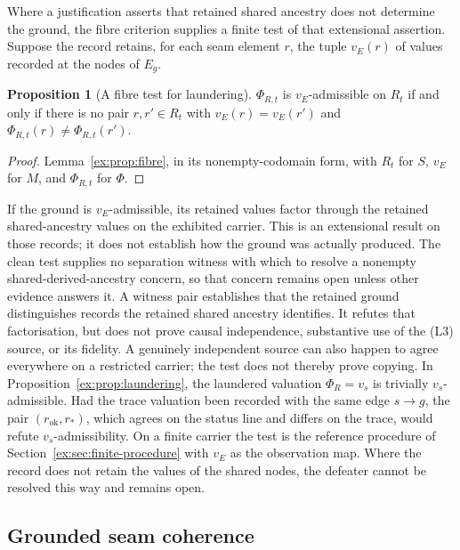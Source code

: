 \documentclass[11pt]{article}
\theoremstyle{definition}
\newtheorem{proposition}{Proposition}[section]
\begin{document}
Where a justification asserts that retained shared ancestry does not determine the ground, the fibre criterion supplies a finite test of that extensional assertion. Suppose the record retains, for each seam element $r$, the tuple $v_E(r)$ of values recorded at the nodes of $E_g$.

\begin{proposition}[A fibre test for laundering]\label{ex:prop:laundering-test}
$\Phi_{R,t}$ is $v_E$-admissible on $R_t$ if and only if there is no pair $r,r'\in R_t$ with $v_E(r)=v_E(r')$ and $\Phi_{R,t}(r)\neq\Phi_{R,t}(r')$.
\end{proposition}
\begin{proof}
Lemma~\ref{ex:prop:fibre}, in its nonempty-codomain form, with $R_t$ for $S$, $v_E$ for $M$, and $\Phi_{R,t}$ for $\Phi$.
\end{proof}

If the ground is $v_E$-admissible, its retained values factor through the retained shared-ancestry values on the exhibited carrier. This is an extensional result on those records; it does not establish how the ground was actually produced. The clean test supplies no separation witness with which to resolve a nonempty shared-derived-ancestry concern, so that concern remains open unless other evidence answers it. A witness pair establishes that the retained ground distinguishes records the retained shared ancestry identifies. It refutes that factorisation, but does not prove causal independence, substantive use of the (L3) source, or its fidelity. A genuinely independent source can also happen to agree everywhere on a restricted carrier; the test does not thereby prove copying. In Proposition~\ref{ex:prop:laundering}, the laundered valuation $\Phi_R=v_s$ is trivially $v_s$-admissible. Had the trace valuation been recorded with the same edge $s\to g$, the pair $(r_{\mathrm{ok}},r_*)$, which agrees on the status line and differs on the trace, would refute $v_s$-admissibility. On a finite carrier the test is the reference procedure of Section~\ref{ex:sec:finite-procedure} with $v_E$ as the observation map. Where the record does not retain the values of the shared nodes, the defeater cannot be resolved this way and remains open.

\subsection{Grounded seam coherence}\label{ex:sec:grounded-coherence}
\end{document}
